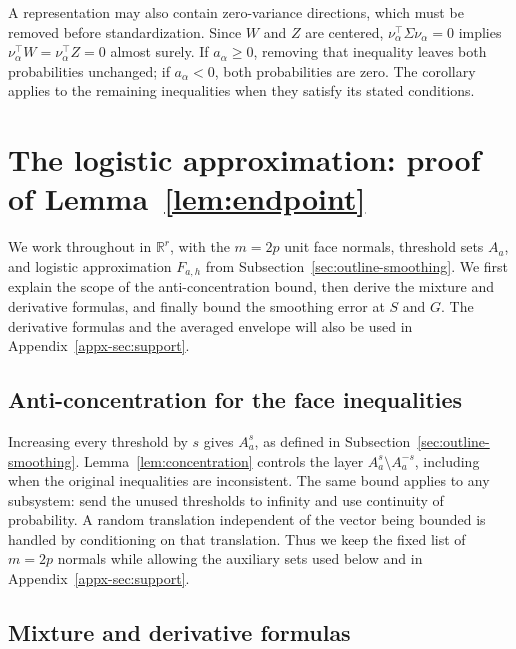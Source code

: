 \documentclass[11pt,letterpaper]{article}
\theoremstyle{remark}
\newcommand{\R}{\mathbb R}
\begin{document}
A representation may also contain zero-variance directions, which
must be removed before standardization. Since \(W\) and \(Z\) are centered,
\(\nu_\alpha^\top\Sigma\nu_\alpha=0\) implies
\(\nu_\alpha^\top W=\nu_\alpha^\top Z=0\) almost surely.
If \(a_\alpha\ge0\), removing that inequality leaves both
probabilities unchanged; if \(a_\alpha<0\), both probabilities
are zero. The corollary applies to the remaining inequalities when
they satisfy its stated conditions.

\section{\texorpdfstring{The logistic approximation: proof of Lemma~\ref{lem:endpoint}}{The logistic approximation: proof of Lemma 2}}\label{appx-sec:smoothing}

We work throughout in \(\R^r\), with the \(m=2p\) unit face normals,
threshold sets \(A_a\), and logistic approximation \(F_{a,h}\) from
Subsection~\ref{sec:outline-smoothing}. We first explain the scope of
the anti-concentration bound, then derive the mixture and derivative
formulas, and finally bound the smoothing error at \(S\) and \(G\).
The derivative formulas and the averaged envelope will also be used
in Appendix~\ref{appx-sec:support}.

\subsection{Anti-concentration for the face inequalities}

Increasing every threshold by \(s\) gives \(A_a^s\), as defined
in Subsection~\ref{sec:outline-smoothing}. Lemma~\ref{lem:concentration}
controls the layer \(A_a^s\setminus A_a^{-s}\), including when
the original inequalities are inconsistent. The same bound applies
to any subsystem: send the unused thresholds to infinity and use
continuity of probability. A random translation independent of the vector being bounded is
handled by conditioning on that translation. Thus we keep the fixed
list of \(m=2p\) normals while allowing the auxiliary sets used
below and in Appendix~\ref{appx-sec:support}.

\subsection{\texorpdfstring{Mixture and derivative formulas}{Mixture and derivative formulas}}\label{appx-sec:mixture}
\end{document}
